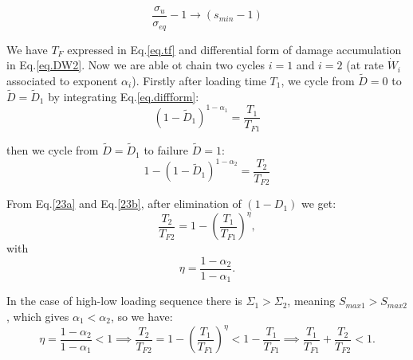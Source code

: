 \documentclass[3p,times,number,review]{elsarticle}
\begin{document}
$$\frac{\sigma_{u}}{\sigma_{eq}} -1 \longrightarrow \left( s_{min}-1\right)  $$


We have $T_F$ expressed in Eq.\eqref{eq.tf} and differential form of damage accumulation in Eq.\eqref{eq.DW2}. Now we are able ot chain two cycles $i=1$ and $i=2$  (at  rate $\dot{W}_i$ associated to exponent $\alpha_i$). Firstly after loading time $T_1$, we  cycle  from $\tilde{D}=0$ to $\tilde{D}= \tilde{D}_1$ by integrating Eq.\eqref{eq.diffform}:
\begin{equation}
\left( 1-\tilde{D}_1\right) ^{1-\alpha_1}=\dfrac{T_1}{T_{F1}}
\label{23a}
\end{equation}

then we cycle from  ${\tilde D}={\tilde D}_1$ to failure ${\tilde D}=1$:
\begin{equation}
1-\left( 1-\tilde{D}_1\right)^{1-\alpha_2}=\dfrac{T_2}{T_{F2}}
\label{23b}
\end{equation}

From Eq.\eqref{23a} and Eq.\eqref{23b}, after elimination of $\left( 1-D_1\right)$ we get:
\begin{equation} 
\dfrac{T_2}{T_{F2}} =1-\left( \dfrac{T_1}{T_{F1}}\right) ^\eta,
\end{equation}
with
\begin{equation}
\eta=\dfrac{1-\alpha_2}{1-\alpha_1}.
\label{eq.eta}
\end{equation}

In the case of high-low loading sequence there is $\Sigma_1>\Sigma_2$, meaning $S_{max1}>S_{max2}$, which gives $\alpha_1<\alpha_2$, so we have:
$$\eta=\frac{1-\alpha_2}{1-\alpha_1}<1 \implies
 \frac{T_2}{T_{F2}}=1-\left( \frac{T_1}{T_{F1}}\right) ^\eta<1-\frac{T_1}{T_{F1}} \implies
\frac{T_1}{T_{F1}}+\frac{T_2}{T_{F2}}<1.$$
\end{document}
